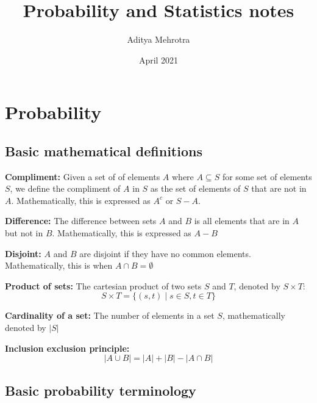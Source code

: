\documentclass{article}
\title{Probability and Statistics notes}
\author{Aditya Mehrotra}
\date{April 2021}
\begin{document}
\maketitle

\tableofcontents

\newpage

\section{Probability}

\subsection{Basic mathematical definitions}

\textbf{Compliment:} Given a set of of elements $A$ where $A \subseteq S$ for some set of elements $S$, we define the compliment of $A$ in $S$ as the set of elements of $S$ that are not in $A$. Mathematically, this is expressed as $A^c$ or $S - A$.

\vspace{2 mm}

\noindent
\textbf{Difference:} The difference between sets $A$ and $B$ is all elements that are in $A$ but not in $B$. Mathematically, this is expressed as $A - B$

\vspace{2 mm}

\noindent
\textbf{Disjoint:} $A$ and $B$ are disjoint if they have no common elements. Mathematically, this is when $A \cap B = \emptyset$

\vspace{2 mm}

\noindent
\textbf{Product of sets:} The cartesian product of two sets $S$ and $T$, denoted by $S \times T$:
$$S \times T = \{(s, t) \mid s \in S, t \in T\}$$

\vspace{2 mm}

\noindent
\textbf{Cardinality of a set:} The number of elements in a set $S$, mathematically denoted by $|S|$

\vspace{2 mm}

\noindent
\textbf{Inclusion exclusion principle:}
$$|A \cup B| = |A| + |B| - |A \cap B|$$


\subsection{Basic probability terminology}
\end{document}
